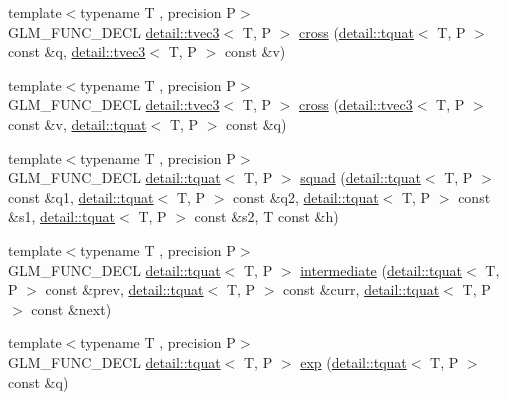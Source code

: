 \begin{DoxyCompactItemize}
\item 
{\footnotesize template$<$typename T , precision P$>$ }\\G\-L\-M\-\_\-\-F\-U\-N\-C\-\_\-\-D\-E\-C\-L \hyperlink{structglm_1_1detail_1_1tvec3}{detail\-::tvec3}$<$ T, P $>$ \hyperlink{group__gtx__quaternion_ga8b5c3ff869c773f26d0a562dfcd3f9e4}{cross} (\hyperlink{structglm_1_1detail_1_1tquat}{detail\-::tquat}$<$ T, P $>$ const \&q, \hyperlink{structglm_1_1detail_1_1tvec3}{detail\-::tvec3}$<$ T, P $>$ const \&v)
\item 
{\footnotesize template$<$typename T , precision P$>$ }\\G\-L\-M\-\_\-\-F\-U\-N\-C\-\_\-\-D\-E\-C\-L \hyperlink{structglm_1_1detail_1_1tvec3}{detail\-::tvec3}$<$ T, P $>$ \hyperlink{group__gtx__quaternion_ga7794f940ba271ff846ea706204b0259a}{cross} (\hyperlink{structglm_1_1detail_1_1tvec3}{detail\-::tvec3}$<$ T, P $>$ const \&v, \hyperlink{structglm_1_1detail_1_1tquat}{detail\-::tquat}$<$ T, P $>$ const \&q)
\item 
{\footnotesize template$<$typename T , precision P$>$ }\\G\-L\-M\-\_\-\-F\-U\-N\-C\-\_\-\-D\-E\-C\-L \hyperlink{structglm_1_1detail_1_1tquat}{detail\-::tquat}$<$ T, P $>$ \hyperlink{group__gtx__quaternion_ga5e756a5817856a3d69f0974fac8322e2}{squad} (\hyperlink{structglm_1_1detail_1_1tquat}{detail\-::tquat}$<$ T, P $>$ const \&q1, \hyperlink{structglm_1_1detail_1_1tquat}{detail\-::tquat}$<$ T, P $>$ const \&q2, \hyperlink{structglm_1_1detail_1_1tquat}{detail\-::tquat}$<$ T, P $>$ const \&s1, \hyperlink{structglm_1_1detail_1_1tquat}{detail\-::tquat}$<$ T, P $>$ const \&s2, T const \&h)
\item 
{\footnotesize template$<$typename T , precision P$>$ }\\G\-L\-M\-\_\-\-F\-U\-N\-C\-\_\-\-D\-E\-C\-L \hyperlink{structglm_1_1detail_1_1tquat}{detail\-::tquat}$<$ T, P $>$ \hyperlink{group__gtx__quaternion_ga96cb50103d939ea50d8b80bc898b2a35}{intermediate} (\hyperlink{structglm_1_1detail_1_1tquat}{detail\-::tquat}$<$ T, P $>$ const \&prev, \hyperlink{structglm_1_1detail_1_1tquat}{detail\-::tquat}$<$ T, P $>$ const \&curr, \hyperlink{structglm_1_1detail_1_1tquat}{detail\-::tquat}$<$ T, P $>$ const \&next)
\item 
{\footnotesize template$<$typename T , precision P$>$ }\\G\-L\-M\-\_\-\-F\-U\-N\-C\-\_\-\-D\-E\-C\-L \hyperlink{structglm_1_1detail_1_1tquat}{detail\-::tquat}$<$ T, P $>$ \hyperlink{group__gtx__quaternion_gaadebfad5c8b4b3dde114915f0494b739}{exp} (\hyperlink{structglm_1_1detail_1_1tquat}{detail\-::tquat}$<$ T, P $>$ const \&q)

\end{DoxyCompactItemize}
